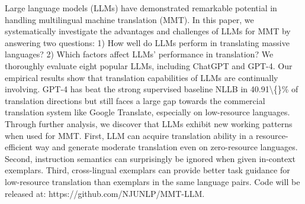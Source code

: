 Large language models (LLMs) have demonstrated remarkable potential in handling multilingual machine translation (MMT). In this paper, we systematically investigate the advantages and challenges of LLMs for MMT by answering two questions: 1) How well do LLMs perform in translating massive languages? 2) Which factors affect LLMs' performance in translation? We thoroughly evaluate eight popular LLMs, including ChatGPT and GPT-4. Our empirical results show that translation capabilities of LLMs are continually involving. GPT-4 has beat the strong supervised baseline NLLB in 40.91\textbackslash\{\}\% of translation directions but still faces a large gap towards the commercial translation system like Google Translate, especially on low-resource languages. Through further analysis, we discover that LLMs exhibit new working patterns when used for MMT. First, LLM can acquire translation ability in a resource-efficient way and generate moderate translation even on zero-resource languages. Second, instruction semantics can surprisingly be ignored when given in-context exemplars. Third, cross-lingual exemplars can provide better task guidance for low-resource translation than exemplars in the same language pairs. Code will be released at: https://github.com/NJUNLP/MMT-LLM.